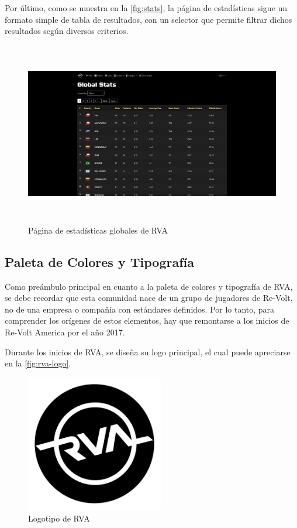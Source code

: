 Por último, como se muestra en la \autoref{fig:stats}, la página de estadísticas sigue un formato simple de tabla de resultados, con un selector que permite filtrar dichos resultados según diversos criterios.

\begin{figure}[H]
  \begin{center}
    \includegraphics[width=15cm, height=8cm]{img/stats.png} 
  \end{center}
  \caption[Página de estadísticas globales de RVA]{Página de estadísticas globales de RVA}
  \label{fig:stats}
\end{figure}

\subsection{Paleta de Colores y Tipografía}
Como preámbulo principal en cuanto a la paleta de colores y tipografía de RVA, se debe recordar que esta comunidad nace de un grupo de jugadores de Re-Volt, no de una empresa o compañía con estándares definidos. Por lo tanto, para comprender los orígenes de estos elementos, hay que remontarse a los inicios de Re-Volt America por el año 2017.

Durante los inicios de RVA, se diseña su logo principal, el cual puede apreciarse en la \autoref{fig:rva-logo}.

\begin{figure}[H]
  \begin{center}
    \includegraphics[width=6cm, height=6cm]{img/rva.png} 
  \end{center}
  \caption[Logotipo de RVA]{Logotipo de RVA}
  \label{fig:rva-logo}
\end{figure}

